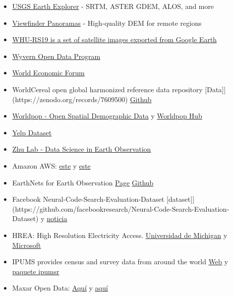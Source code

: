 \documentclass[
  letterpaper,
  DIV=11,
  numbers=noendperiod]{scrartcl}
\begin{document}
\begin{itemize}
{  Clouds}
\item
  \href{https://earthexplorer.usgs.gov/}{USGS Earth Explorer} - SRTM,
  ASTER GDEM, ALOS, and more
\item
  \href{https://viewfinderpanoramas.org/}{Viewfinder Panoramas} -
  High-quality DEM for remote regions
\item
  \href{https://paperswithcode.com/dataset/whu-rs19}{WHU-RS19 is a set
  of satellite images exported from Google Earth}
\item
  \href{https://wyvern.space/open-data/}{Wyvern Open Data Program}
\item
  \href{https://www.weforum.org/publications/}{World Economic Forum}
\item
  WorldCereal open global harmonized reference data repository
  {[}Data{]}{]}(https://zenodo.org/records/7609500)
  \href{https://github.com/WorldCereal/worldcereal-classification}{Github}
\item
  \href{https://www.worldpop.org/}{Worldpop - Open Spatial Demographic
  Data} y \href{https://hub.worldpop.org/}{Worldpop Hub}
\item
  \href{https://business.yelp.com/data/resources/open-dataset/}{Yelp
  Dataset}
\item
  \href{https://github.com/zhu-xlab}{Zhu Lab - Data Science in Earth
  Observation}
\item
  Amazon AWS: \href{http://aws.amazon.com/es/datasets/}{este} y
  \href{https://aws.amazon.com/es/public-data-sets/}{este}
\item
  EarthNets for Earth Observation
  \href{https://earthnets.nicepage.io/}{Page}
  \href{https://github.com/EarthNets}{Github}
\item
  Facebook Neural-Code-Search-Evaluation-Dataset
  {[}dataset{]}{]}(https://github.com/facebookresearch/Neural-Code-Search-Evaluation-Dataset)
  y
  \href{https://venturebeat.com/technology/facebook-open-sources-data-set-for-code-search-ai-benchmark}{noticia}
\item
  HREA: High Resolution Electricity Access.
  \href{https://hrea.isr.umich.edu/index.html}{Universidad de Michigan}
  y
  \href{https://planetarycomputer.microsoft.com/dataset/hrea\#overview}{Microsoft}
\item
  IPUMS provides census and survey data from around the world
  \href{https://www.ipums.org/}{Web} y
  \href{https://tech.popdata.org/ipumsr/}{paquete ipumsr}
\item
  Maxar Open Data:
  \href{https://github.com/opengeos/maxar-open-data}{Aquí} y
  \href{https://radiantearth.github.io/stac-browser/\#/external/maxar-opendata.s3.amazonaws.com/events/catalog.json?.language=es}{aquí}

\end{itemize}
\end{document}
